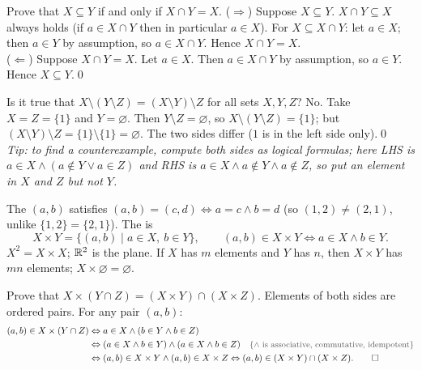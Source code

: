 \begin{hexample}
Prove that $X\subseteq Y$ if and only if $X\cap Y=X$.
\solution
($\Rightarrow$) Suppose $X\subseteq Y$. $X\cap Y\subseteq X$ always holds (if $a\in X\cap Y$ then in particular $a\in X$). For $X\subseteq X\cap Y$: let $a\in X$; then $a\in Y$ by assumption, so $a\in X\cap Y$. Hence $X\cap Y=X$.\\
($\Leftarrow$) Suppose $X\cap Y=X$. Let $a\in X$. Then $a\in X\cap Y$ by assumption, so $a\in Y$. Hence $X\subseteq Y$.\qed
\end{hexample}

\begin{hexample}
Is it true that $X\setminus(Y\setminus Z)=(X\setminus Y)\setminus Z$ for all sets $X,Y,Z$?
\solution
No. Take $X=Z=\{1\}$ and $Y=\varnothing$. Then $Y\setminus Z=\varnothing$, so $X\setminus(Y\setminus Z)=\{1\}$; but $(X\setminus Y)\setminus Z=\{1\}\setminus\{1\}=\varnothing$. The two sides differ ($1$ is in the left side only).\qed\\
\emph{Tip: to find a counterexample, compute both sides as logical formulas; here LHS is $a\in X\wedge(a\notin Y\vee a\in Z)$ and RHS is $a\in X\wedge a\notin Y\wedge a\notin Z$, so put an element in $X$ and $Z$ but not $Y$.}
\end{hexample}

\begin{key}
The  $(a,b)$ satisfies $(a,b)=(c,d)\Leftrightarrow a=c\wedge b=d$ (so $(1,2)\neq(2,1)$, unlike $\{1,2\}=\{2,1\}$). The  is
\[
X\times Y=\{(a,b)\mid a\in X,\ b\in Y\},\qquad (a,b)\in X\times Y\Leftrightarrow a\in X\wedge b\in Y.
\]
$X^2=X\times X$; $\mathbb{R}^2$ is the plane. If $X$ has $m$ elements and $Y$ has $n$, then $X\times Y$ has $mn$ elements; $X\times\varnothing=\varnothing$.
\end{key}

\begin{hexample}
Prove that $X\times(Y\cap Z)=(X\times Y)\cap(X\times Z)$.
\solution
Elements of both sides are ordered pairs. For any pair $(a,b)$:
\begin{align*}
(a,b)\in X\times(Y\cap Z)&\Leftrightarrow a\in X\wedge(b\in Y\wedge b\in Z)\\
&\Leftrightarrow(a\in X\wedge b\in Y)\wedge(a\in X\wedge b\in Z)\reason{$\wedge$ is associative, commutative, idempotent}\\
&\Leftrightarrow(a,b)\in X\times Y\wedge(a,b)\in X\times Z\Leftrightarrow(a,b)\in(X\times Y)\cap(X\times Z).\qquad\square
\end{align*}
\end{hexample}

